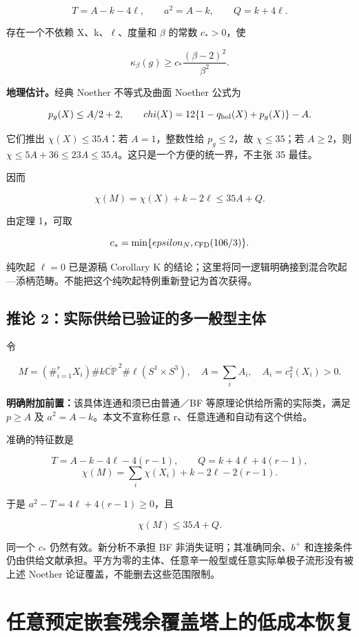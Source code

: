 \documentclass[UTF8,11pt,fontset=none]{ctexart}
\begin{document}
\[
T=A-k-4\ell,\qquad a^2=A-k,\qquad Q=k+4\ell.
\]

存在一个不依赖 X、k、\(\ell\)、度量和 \(\beta\) 的常数 \(c_*>0\)，使

\[
\boxed{\kappa_\beta(g)\ge
c_*\frac{(\beta-2)^2}{\beta^2}.}
\tag{8.3}\label{eq:r8:3}
\]

\textbf{地理估计。}经典 Noether 不等式及曲面 Noether 公式为

\[
p_g(X)\le A/2+2,
\qquad
\chi(X)=12\{1-q_{\rm hol}(X)+p_g(X)\}-A.
\]

它们推出 \(\chi(X)\le35A\)：若 \(A=1\)，整数性给 \(p_g\le2\)，故 \(\chi\le35\)；若 \(A\ge2\)，则 \(\chi\le5A+36\le23A\le35A\)。这只是一个方便的统一界，不主张 35 最佳。

因而

\[
\chi(M)=\chi(X)+k-2\ell\le35A+Q.
\]

由定理 1，可取

\[
c_* =\min\{\varepsilon_N,c_{\rm FD}(106/3)\}.
\]

纯吹起 \(\ell=0\) 已是源稿 Corollary K 的结论；这里将同一逻辑明确接到混合吹起---添柄范畴。不能把这个纯吹起特例重新登记为首次获得。

\subsection{推论 2：实际供给已验证的多一般型主体}\label{ch8:ux63a8ux8bba-2ux5b9eux9645ux4f9bux7ed9ux5df2ux9a8cux8bc1ux7684ux591aux4e00ux822cux578bux4e3bux4f53}

\cite{BF}

令

\[
M=(\#_{i=1}^{r}X_i)\#k\overline{\mathbb{CP}}^{\,2}
\#\ell(S^1\times S^3),
\quad A=\sum_i A_i,\quad A_i=c_1^2(X_i)>0.
\]

\textbf{明确附加前置：}该具体连通和须已由普通／BF 等原理论供给所需的实际类，满足 \(p\ge A\) 及 \(a^2=A-k\)。本文不宣称任意 r、任意连通和自动有这个供给。

准确的特征数是

\[
T=A-k-4\ell-4(r-1),\qquad
Q=k+4\ell+4(r-1),
\] \[
\chi(M)=\sum_i\chi(X_i)+k-2\ell-2(r-1).
\]

于是 \(a^2-T=4\ell+4(r-1)\ge0\)，且

\[
\chi(M)\le35A+Q.
\]

同一个 \(c_*\) 仍然有效。新分析不承担 BF 非消失证明；其准确同余、\(b^+\) 和连接条件仍由供给文献承担。平方为零的主体、任意辛一般型或任意实际单极子流形没有被上述 Noether 论证覆盖，不能删去这些范围限制。

\section{任意预定嵌套残余覆盖塔上的低成本恢复}\label{ch8:ux4efbux610fux9884ux5b9aux5d4cux5957ux6b8bux4f59ux8986ux76d6ux5854ux4e0aux7684ux4f4eux6210ux672cux6062ux590d}
\end{document}
